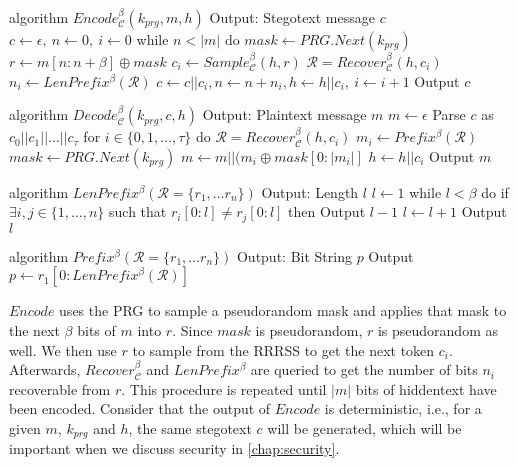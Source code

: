 \begin{Pseudocode}[caption={$Encode$ algorithm \cite{Meteor2021}}, label={alg:encode}]
algorithm $Encode_{\mathcal{C}}^\beta(k_{prg}, m, h)$
  Output: Stegotext message $c$
  $c \leftarrow \epsilon,~ n \leftarrow 0,~ i \leftarrow 0$
  while $n < |m|$ do
    $mask \leftarrow PRG.Next(k_{prg})$
    $r \leftarrow m[n:n+\beta] \oplus mask$
    $c_i \leftarrow Sample_{\mathcal{C}}^\beta(h, r)$
    $\mathcal{R} = Recover_{\mathcal{C}}^\beta(h, c_i)$
    $n_i \leftarrow LenPrefix^\beta(\mathcal{R})$
    $c \leftarrow c || c_i, n \leftarrow n+n_i, h \leftarrow h||c_i,~ i \leftarrow i + 1$
  Output $c$
\end{Pseudocode}%
\newpage
\begin{Pseudocode}[float, caption={$Decode$ algorithm \cite{Meteor2021}}, label={alg:decode}]
algorithm $Decode_{\mathcal{C}}^\beta(k_{prg}, c, h)$
  Output: Plaintext message $m$
  $m \leftarrow \epsilon$
  Parse $c$ as $c_0 || c_1 || \dots || c_{\tau}$
  for $i \in \{ 0, 1, \dots, \tau \}$ do
    $\mathcal{R} = Recover_{\mathcal{C}}^\beta(h, c_i)$
    $m_i \leftarrow Prefix^\beta(\mathcal{R})$
    $mask \leftarrow PRG.Next(k_{prg})$
    $m \leftarrow m || (m_i \oplus mask[0: |m_i|]$
    $h \leftarrow h||c_i$
  Output $m$
\end{Pseudocode}%

\begin{Pseudocode}[caption={$LenPrefix$ algorithm \cite{Meteor2021}}]
algorithm $LenPrefix^\beta(\mathcal R = \{ r_1, \dots r_n \})$
  Output: Length $l$
  $l \leftarrow 1$
  while $l < \beta$ do
    if $\exists i, j \in \{ 1, \dots, n \}$ such that $r_i[0: l] \neq r_j[0:  l]$ then
      Output $l-1$
    $l \leftarrow l+1$
  Output $l$
\end{Pseudocode}%

\begin{Pseudocode}[caption={$Prefix$ algorithm \cite{Meteor2021}}]
algorithm $Prefix^\beta(  \mathcal R = \{ r_1, \dots r_n \})$
  Output: Bit String $p$
  Output $p \leftarrow r_1[0: LenPrefix^\beta(\mathcal{R})]$
\end{Pseudocode}%

$Encode$ uses the PRG to sample a pseudorandom mask and applies that mask to the next $\beta$ bits of $m$ into $r$.
Since $mask$ is pseudorandom, $r$ is pseudorandom as well.
We then use $r$ to sample from the RRRSS to get the next token $c_i$.
Afterwards, $Recover_{\mathcal{C}}^\beta$ and $LenPrefix^\beta$ are queried to get the number of bits $n_i$ recoverable from $r$.
This procedure is repeated until $|m|$ bits of hiddentext have been encoded.
Consider that the output of $Encode$ is deterministic, i.e., for a given $m$, $k_{prg}$ and $h$, the same stegotext $c$ will be generated, which will be important when we discuss security in \autoref{chap:security}.

